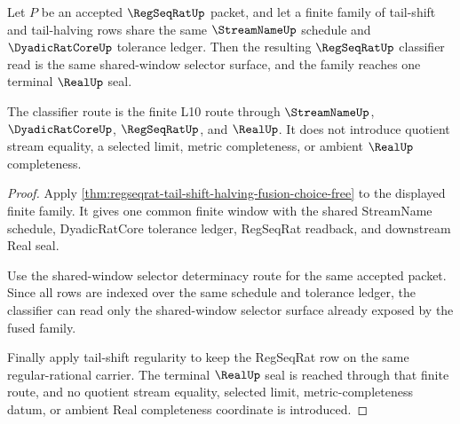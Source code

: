 \begin{theorem}
\label{thm:regseqrat-tail-halving-classifier-fusion}
Let $P$ be an accepted $\RegSeqRatUp$ packet, and let a finite family of tail-shift and tail-halving rows share the same $\StreamNameUp$ schedule and $\DyadicRatCoreUp$ tolerance ledger. Then the resulting $\RegSeqRatUp$ classifier read is the same shared-window selector surface, and the family reaches one terminal $\RealUp$ seal.

The classifier route is the finite L10 route through $\StreamNameUp$, $\DyadicRatCoreUp$, $\RegSeqRatUp$, and $\RealUp$. It does not introduce quotient stream equality, a selected limit, metric completeness, or ambient $\RealUp$ completeness.
\end{theorem}
\begin{proof}
Apply \autoref{thm:regseqrat-tail-shift-halving-fusion-choice-free} to the displayed finite family. It gives one common finite window with the shared StreamName schedule, DyadicRatCore tolerance ledger, RegSeqRat readback, and downstream Real seal.

Use the shared-window selector determinacy route for the same accepted packet. Since all rows are indexed over the same schedule and tolerance ledger, the classifier can read only the shared-window selector surface already exposed by the fused family.

Finally apply tail-shift regularity to keep the RegSeqRat row on the same regular-rational carrier. The terminal $\RealUp$ seal is reached through that finite route, and no quotient stream equality, selected limit, metric-completeness datum, or ambient Real completeness coordinate is introduced.
\end{proof}

